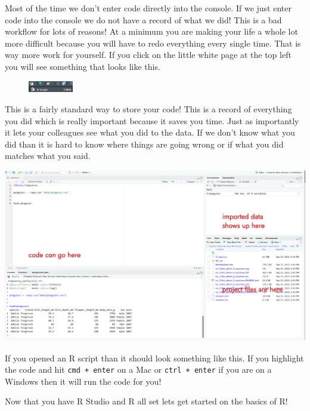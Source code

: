 \documentclass[
  letterpaper,
  DIV=11,
  numbers=noendperiod,
  oneside]{scrreprt}
\begin{document}
Most of the time we don't enter code directly into the console. If we
just enter code into the console we do not have a record of what we did!
This is a bad workflow for lots of reasons! At a minimum you are making
your life a whole lot more difficult because you will have to redo
everything every single time. That is way more work for yourself. If you
click on the little white page at the top left you will see something
that looks like this.

\begin{figure}

{\centering \includegraphics[width=0.77in,height=\textheight]{figs/rscript-open.png}

}

\end{figure}

This is a fairly standard way to store your code! This is a record of
everything you did which is really important because it saves you time.
Just as importantly it lets your colleagues see what you did to the
data. If we don't know what you did than it is hard to know where things
are going wrong or if what you did matches what you said.

\includegraphics[width=8.21in,height=\textheight]{figs/annotate-two-r.png}

If you opened an R script than it should look something like this. If
you highlight the code and hit \texttt{cmd\ +\ enter} on a Mac or
\texttt{ctrl\ +\ enter} if you are on a Windows then it will run the
code for you!

Now that you have R Studio and R all set lets get started on the basics
of R!

\end{document}
